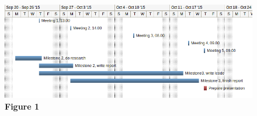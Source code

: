 \documentclass[a4paper]{article}
\begin{document}
\begin{figure}[t]

\hspace*{-1.5in}
\includegraphics[scale=0.7]{gannt.png}
\textbf{Figure 1}
\end{figure}
\end{document}

